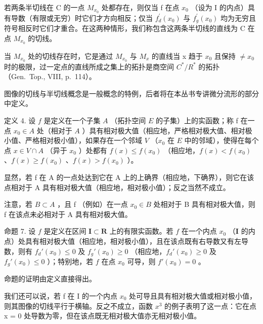 若两条半切线在 C 的一点 \(M_{x_{0}}\) 处都存在，则仅当 f 在点 \(x_{0}\) （设为 I 的内点）具有导数（有限或无穷）时它们才方向相反；仅当 \(f_{d}^{\prime}(x_{0})\) 与 \(f_{g}^{\prime}(x_{0})\) 均为无穷且符号相反时它们才重合。在这两种情形，我们称包含这两条半切线的直线为 C 在点 \(M_{x_{0}}\) 的切线。

当 \(M_{x_{0}}\) 处的切线存在时，它是通过 \(M_{x_{0}}\) 与 \(M_{x}\) 的直线当 x 趋于 \(x_{0}\) 且保持 \(\neq x_{0}\) 时的极限，过一定点的直线所成之集上的拓扑是商空间 \(C^{*}/R^{*}\) 的拓扑（Gen.~Top., VIII, p.~114）。

图像的切线与半切线概念是一般概念的特例，后者将在本丛书专讲微分流形的部分中定义。

定义 4. 设 \(f\) 是定义在一个子集 \(A\) （拓扑空间 \(E\) 的子集）上的实函数；称 f 在一点 \(x_0 \in A\) 处（相对于 \(A\) ）具有相对极大值（相应地，严格相对极大值、相对极小值、严格相对极小值），如果存在一个邻域 \(V\) （\(x_0\) 在 \(E\) 中的邻域），使得在每个点 \(x \in V \cap A\) （异于 \(x_0\) ）处都有 \(f(x) \leqslant f(x_0)\) （相应地，\(f(x) < f(x_0)\) 、\(f(x) \geqslant f(x_0)\) 、\(f(x) > f(x_0)\) ）。

显然，若 f 在 A 的一点处达到它在 A 上的上确界（相应地，下确界），则它在该点相对于 A 具有相对极大值（相应地，相对极小值）；反之当然不成立。

注意，若 \(B \subset A\) ，且 f （例如）在一点 \(x_{0} \in B\) 处相对于 B 具有相对极大值，则 f 在该点未必相对于 A 具有相对极大值。

命题 7. 设 \(f\) 是定义在区间 \(\mathbf{I} \subset \mathbf{R}\) 上的有限实函数。若 \(f\) 在一个内点 \(x_0\) （\(\mathbf{I}\) 的内点）处具有相对极大值（相应地，相对极小值），且在该点既有右导数又有左导数，则有 \(f_d'(x_0) \leqslant 0\) 及 \(f_g'(x_0) \geqslant 0\) （相应地，\(f_d'(x_0) \geqslant 0\) 及 \(f_g'(x_0) \leqslant 0\) ）；特别地，若 \(f\) 在点 \(x_0\) 可导，则 \(f'(x_0) = 0\) 。

命题的证明由定义直接得出。

我们还可以说，若 f 在 I 的一个内点 \(x_{0}\) 处可导且具有相对极大值或相对极小值，则其图像的切线平行于横轴。反之不成立，函数 \(x^{3}\) 的例子表明了这一点：它在点 x = 0 处导数为零，但在该点既无相对极大值亦无相对极小值。

